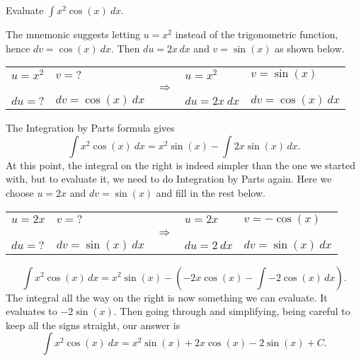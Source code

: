 \begin{example} \label{eg:5.1.4} %
Evaluate $\displaystyle \int x^2\cos(x) \ dx$.

\solution The mnemonic suggests letting $u=x^2$ instead of the trigonometric function, hence $dv=\cos(x) \ dx$.  Then $du=2x\,dx$ and $v=\sin(x)$ as shown below. 

\begin{tabular}{llcll} \\
$u= x^2$ & $v=\text{?}$ & & $u= x^2$ & $v=\sin(x)$ \\
 && $\Rightarrow$ && \\
$du= \text{?}$ & $dv=\cos(x)\ dx$ & &  $du= 2x\ dx$ & $dv=\cos(x) \ dx$ \\
\end{tabular}

\vspace{.25cm}

The Integration by Parts formula gives
$$\int x^2\cos(x) \ dx = x^2\sin(x) - \int 2x\sin(x)\,dx.$$
At this point, the integral on the right is indeed simpler than the one we started with, but to evaluate it, we need to do Integration by Parts again. Here we choose $u=2x$ and $dv=\sin(x)$ and fill in the rest below.\\

\begin{tabular}{llcll} \\
$u= 2x$ & $v=\text{?}$ & & $u= 2x$ & $v=-\cos(x)$ \\
 && $\Rightarrow$ && \\
$du= \text{?}$ & $dv=\sin(x)\ dx$ & &  $du= 2\ dx$ & $dv=\sin(x)\ dx$ \\
\end{tabular}

$$\int x^2\cos(x)\,dx = x^2\sin(x) - \left(-2x\cos(x) - \int -2\cos(x)\,dx\right).$$
The integral all the way on the right is now something we can evaluate.  It evaluates to $-2\sin(x)$.  Then going through and simplifying, being careful to keep all the signs straight, our answer is
$$\int x^2\cos(x)\ dx = x^2\sin(x)  + 2x\cos(x) - 2\sin(x) + C.$$

\end{example}